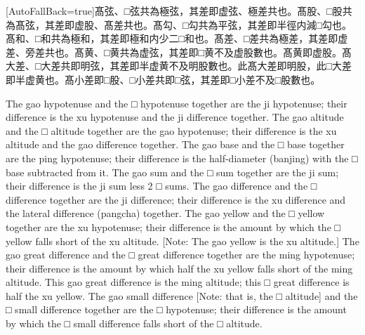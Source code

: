 \documentclass[11pt]{article}
\newcommand{\zhsmall}{\footnotesize\color{black!70}}
\newcommand{\unitlabel}[1]{\marginpar{\raggedleft\tiny\color{gray}#1}}
\newenvironment{unitzh}{\par\CJKfontspec{Noto Serif CJK SC}[AutoFallBack=true]\large\linespread{1.25}\selectfont}{\par}
\newenvironment{uniten}{\par\small\color{black!85}}{\par\medskip}
\begin{document}
\begin{unitzh}\unitlabel{ceyuan-005.5}髙弦、□弦共為極弦，其差即虚弦、極差共也。髙股、□股共為髙弦，其差即虚股、髙差共也。髙勾、□勾共為平弦，其差即半徑内減□勾也。髙和、□和共為極和，其差即極和内少二□和也。髙差、□差共為極差，其差即虚差、旁差共也。髙黄、□黄共為虚弦，其差即□黄不及虚股數也。{\zhsmall 髙黄即虚股。}髙大差、□大差共即明弦，其差即半虚黄不及明股數也。此髙大差即明股，此□大差即半虚黄也。髙小差{\zhsmall 即□股}、□小差共即□弦，其差即□小差不及□股數也。\end{unitzh}
\begin{uniten}The gao hypotenuse and the □ hypotenuse together are the ji hypotenuse; their difference is the xu hypotenuse and the ji difference together. The gao altitude and the □ altitude together are the gao hypotenuse; their difference is the xu altitude and the gao difference together. The gao base and the □ base together are the ping hypotenuse; their difference is the half-diameter (banjing) with the □ base subtracted from it. The gao sum and the □ sum together are the ji sum; their difference is the ji sum less 2 □ sums. The gao difference and the □ difference together are the ji difference; their difference is the xu difference and the lateral difference (pangcha) together. The gao yellow and the □ yellow together are the xu hypotenuse; their difference is the amount by which the □ yellow falls short of the xu altitude. [Note: The gao yellow is the xu altitude.] The gao great difference and the □ great difference together are the ming hypotenuse; their difference is the amount by which half the xu yellow falls short of the ming altitude. This gao great difference is the ming altitude; this □ great difference is half the xu yellow. The gao small difference [Note: that is, the □ altitude] and the □ small difference together are the □ hypotenuse; their difference is the amount by which the □ small difference falls short of the □ altitude.\end{uniten}
\end{document}

